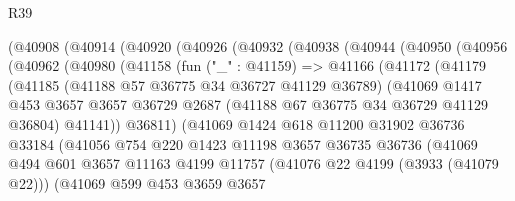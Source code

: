 \begin{lexlean}{R39}
\begin{coremodule}
          (@40908
            (@40914
              (@40920
                (@40926
                  (@40932
                    (@40938
                      (@40944
                        (@40950
                          (@40956
                            (@40962
                              (@40980
                                (@41158
                                  (fun ("_" : @41159) =>
                                  @41166
                                    (@41172
                                      (@41179
                                        (@41185
                                          (@41188 @57 @36775 @34 @36727 @41129 @36789)
                                          (@41069
                                            @1417
                                            @453
                                            @3657
                                            @3657
                                            @36729
                                            @2687
                                            (@41188 @67 @36775 @34 @36729 @41129 @36804)
                                            @41141))
                                        @36811)
                                      (@41069
                                        @1424
                                        @618
                                        @11200
                                        @31902
                                        @36736
                                        @33184
                                        (@41056
                                          @754
                                          @220
                                          @1423
                                          @11198
                                          @3657
                                          @36735
                                          @36736
                                          (@41069
                                            @494
                                            @601
                                            @3657
                                            @11163
                                            @4199
                                            @11757
                                            (@41076 @22 @4199 (@3933 (@41079 @22)))
                                            (@41069
                                              @599
                                              @453
                                              @3659
                                              @3657

\end{coremodule}
\end{lexlean}
